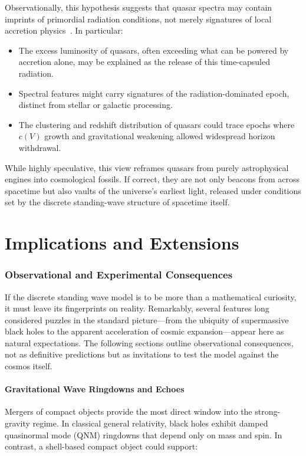\documentclass[12pt]{article}
\begin{document}
Observationally, this hypothesis suggests that quasar spectra may contain imprints of primordial radiation conditions, not merely signatures of local accretion physics~\cite{ozel2010,king2006}. In particular:
\begin{itemize}
    \item The excess luminosity of quasars, often exceeding what can be powered by accretion alone, may be explained as the release of this time-capsuled radiation.
    \item Spectral features might carry signatures of the radiation-dominated epoch, distinct from stellar or galactic processing.
    \item The clustering and redshift distribution of quasars could trace epochs where $c(V)$ growth and gravitational weakening allowed widespread horizon withdrawal.
\end{itemize}

While highly speculative, this view reframes quasars from purely astrophysical engines into cosmological fossils. If correct, they are not only beacons from across spacetime but also vaults of the universe’s earliest light, released under conditions set by the discrete standing-wave structure of spacetime itself.


\cleardoublepage
\part{Implications and Extensions}

\section{Observational and Experimental Consequences}

If the discrete standing wave model is to be more than a mathematical curiosity, it must leave its fingerprints on reality. Remarkably, several features long considered puzzles in the standard picture---from the ubiquity of supermassive black holes to the apparent acceleration of cosmic expansion---appear here as natural expectations. The following sections outline observational consequences, not as definitive predictions but as invitations to test the model against the cosmos itself.

\subsection{Gravitational Wave Ringdowns and Echoes}

Mergers of compact objects provide the most direct window into the strong-gravity regime. In classical general relativity, black holes exhibit damped quasinormal mode (QNM) ringdowns that depend only on mass and spin. In contrast, a shell-based compact object could support:
\end{document}
